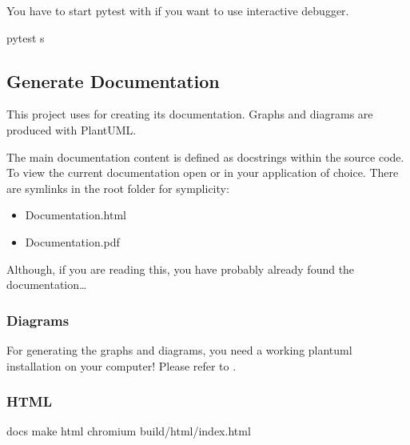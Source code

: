 \documentclass[a4paper,10pt, twoside,english]{sphinxmanual}
\begin{document}
You have to start pytest with  if you want to use interactive debugger.

\begin{sphinxVerbatim}[commandchars=\\\{\}]
\PYGZdl{} pytest \PYGZhy{}s
\end{sphinxVerbatim}


\subsection{Generate Documentation}
\label{\detokenize{setup_development_testing:generate-documentation}}
This project uses  for creating its documentation.
Graphs and diagrams are produced with PlantUML.

The main documentation content is defined as docstrings within the source code.
To view the current documentation open 
or  in your application of choice.
There are symlinks in the root folder for symplicity:
\begin{itemize}
\item {} 
Documentation.html

\item {} 
Documentation.pdf

\end{itemize}

Although, if you are reading this, you have probably already found the documentation…


\subsubsection{Diagrams}
\label{\detokenize{setup_development_testing:diagrams}}
For generating the graphs and diagrams, you need a working plantuml installation
on your computer! Please refer to .


\subsubsection{HTML}
\label{\detokenize{setup_development_testing:id5}}
\begin{sphinxVerbatim}[commandchars=\\\{\}]
\PYGZdl{}  docs
\PYGZdl{} make html
\PYGZdl{} chromium build/html/index.html
\end{sphinxVerbatim}
\end{document}
